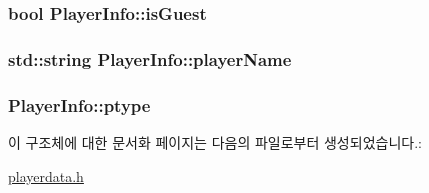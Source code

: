 \hypertarget{struct_player_info_a486ef88d7337edab71e381c212f062f2}{
\subsubsection[{is\-Guest}]{\setlength{\rightskip}{0pt plus 5cm}bool Player\-Info\-::is\-Guest}}\label{struct_player_info_a486ef88d7337edab71e381c212f062f2}
\hypertarget{struct_player_info_a3d3262624b58928b67d59b6049995510}{
\subsubsection[{player\-Name}]{\setlength{\rightskip}{0pt plus 5cm}std\-::string Player\-Info\-::player\-Name}}\label{struct_player_info_a3d3262624b58928b67d59b6049995510}
\hypertarget{struct_player_info_ad5f6464116a3777bd7e3316ac58862d0}{
\subsubsection[{ptype}]{ Player\-Info\-::ptype}}\label{struct_player_info_ad5f6464116a3777bd7e3316ac58862d0}


이 구조체에 대한 문서화 페이지는 다음의 파일로부터 생성되었습니다.\-:\begin{DoxyCompactItemize}
\item 
\hyperlink{playerdata_8h}{playerdata.\-h}\end{DoxyCompactItemize}

